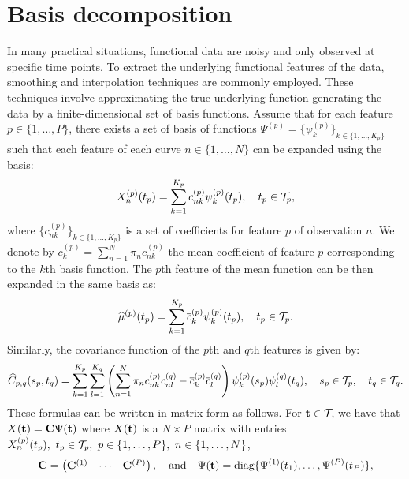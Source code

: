\section{Basis decomposition} %
\label{sub:basis_decomposition}


In many practical situations, functional data are noisy and only observed at specific time points. To extract the underlying functional features of the data, smoothing and interpolation techniques are commonly employed. These techniques involve approximating the true underlying function generating the data by a finite-dimensional set of basis functions. Assume that for each feature $p \in \{1, \dots, P\}$, there exists a set of basis of functions $\Psi^{(p)} = \{\psi_k^{(p)}\}_{k \in \{1, \dots, K_p\}}$ such that each feature of each curve $n \in \{1, \dots, N\}$ can be expanded using the basis:
\begin{equation}\label{eq:curve_basis_expansion}
X_n^{(p)}(t_p) = \sum_{k = 1}^{K_p} c^{(p)}_{nk}\psi_k^{(p)}(t_p), \quad t_p \in \mathcal{T}_{p},
\end{equation}
where $\{c^{(p)}_{nk}\}_{k \in \{1, \dots, K_p\}}$ is a set of coefficients for feature $p$ of observation $n$. We denote by $\overline{c}_k^{(p)} = \sum_{n = 1}^N \pi_n c^{(p)}_{nk}$ the mean coefficient of feature $p$ corresponding to the $k$th basis function.
The $p$th feature of the mean function can be then expanded in the same basis as:
\begin{equation}
    \widehat{\mu}^{(p)}(t_p) = \sum_{k = 1}^{K_p} \overline{c}_k^{(p)}\psi_k^{(p)}(t_p), \quad t_p \in \mathcal{T}_{p}.
\end{equation}
Similarly, the covariance function of the $p$th and $q$th features is given by:
\begin{equation}
    \widehat{C}_{p,q}(s_p, t_q) = \sum_{k = 1}^{K_p} \sum_{l = 1}^{K_q} \left(\sum_{n = 1}^N \pi_n c^{(p)}_{nk}c^{(q)}_{nl} - \overline{c}_k^{(p)}\overline{c}_l^{(q)}\right)\psi_k^{(p)}(s_p)\psi_l^{(q)}(t_q), \quad s_p \in \mathcal{T}_{p},\quad t_q \in \mathcal{T}_{q}.
\end{equation}
These formulas can be written in matrix form as follows. For $\mathbf{t} \in \mathcal{T}_{}$, we have that $X(\mathbf{t}) = \mathbf{C}\Psi(\mathbf{t})$ where $X(\mathbf{t})$ is a $N \times P$ matrix with entries $X_n^{(p)}(t_p),~t_p \in \mathcal{T}_{p},~p \in \{1, \dots,  P\},~n \in \{1, \dots, N\}$,
\begin{equation}
    \mathbf{C} = \begin{pmatrix}
            \mathbf{C}^{(1)} & \cdots & \mathbf{C}^{(P)} \\
        \end{pmatrix}, \quad \text{and}\quad
    \Psi(\mathbf{t}) = \text{diag}\{\Psi^{(1)}(t_1), \dots, \Psi^{(P)}(t_P)\},
\end{equation}
